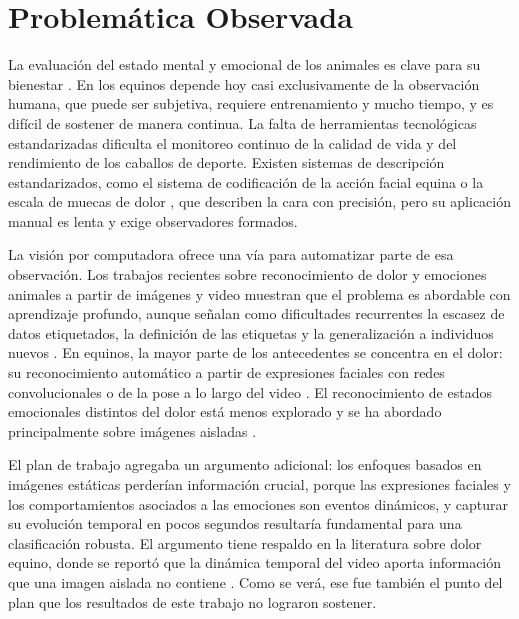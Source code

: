 
\section{Problemática Observada}
La evaluación del estado mental y emocional de los animales es clave para su bienestar \parencite{mendl2010}. En los equinos depende hoy casi exclusivamente de la observación humana, que puede ser subjetiva, requiere entrenamiento y mucho tiempo, y es difícil de sostener de manera continua. La falta de herramientas tecnológicas estandarizadas dificulta el monitoreo continuo de la calidad de vida y del rendimiento de los caballos de deporte. Existen sistemas de descripción estandarizados, como el sistema de codificación de la acción facial equina \parencite[EquiFACS;][]{wathan2015} o la escala de muecas de dolor \parencite{dallacosta2014}, que describen la cara con precisión, pero su aplicación manual es lenta y exige observadores formados.

La visión por computadora ofrece una vía para automatizar parte de esa observación. Los trabajos recientes sobre reconocimiento de dolor y emociones animales a partir de imágenes y video muestran que el problema es abordable con aprendizaje profundo, aunque señalan como dificultades recurrentes la escasez de datos etiquetados, la definición de las etiquetas y la generalización a individuos nuevos \parencite{broome2023}. En equinos, la mayor parte de los antecedentes se concentra en el dolor: su reconocimiento automático a partir de expresiones faciales con redes convolucionales \parencite{lencioni2021,andersen2021} o de la pose a lo largo del video \parencite{rashid2022}. El reconocimiento de estados emocionales distintos del dolor está menos explorado y se ha abordado principalmente sobre imágenes aisladas \parencite{corujo2021}.

El plan de trabajo agregaba un argumento adicional: los enfoques basados en imágenes estáticas perderían información crucial, porque las expresiones faciales y los comportamientos asociados a las emociones son eventos dinámicos, y capturar su evolución temporal en pocos segundos resultaría fundamental para una clasificación robusta. El argumento tiene respaldo en la literatura sobre dolor equino, donde se reportó que la dinámica temporal del video aporta información que una imagen aislada no contiene \parencite{broome2019}. Como se verá, ese fue también el punto del plan que los resultados de este trabajo no lograron sostener.

